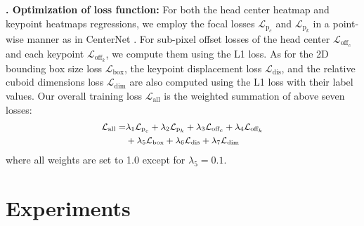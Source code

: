 \documentclass{article}
\begin{document}
{\bf {}. Optimization of loss function:}
For both the head center heatmap and keypoint heatmaps regressions, we employ the focal losses \cite{lin2017focal} $\mathcal{L}_{\textrm{p}_c}$ and $\mathcal{L}_{\textrm{p}_k}$ in a point-wise manner as in CenterNet \cite{zhou2019objects}. For sub-pixel offset losses of the head center $\mathcal{L}_{\textrm{off}_c}$ and each keypoint $\mathcal{L}_{\textrm{off}_k}$, we compute them using the L1 loss. As for the 2D bounding box size loss $\mathcal{L}_\textrm{box}$, the keypoint displacement loss $\mathcal{L}_\textrm{dis}$, and the relative cuboid dimensions loss $\mathcal{L}_\textrm{dim}$ are also computed using the L1 loss with their label values. Our overall training loss $\mathcal{L}_\textrm{all}$ is the weighted summation of above seven losses:
\begin{equation}\small \begin{aligned}
    \mathcal{L}_\textrm{all} = & \lambda_1\mathcal{L}_{\textrm{p}_c} + \lambda_2\mathcal{L}_{\textrm{p}_k} + \lambda_3\mathcal{L}_{\textrm{off}_c} + \lambda_4\mathcal{L}_{\textrm{off}_k} \\
    & + \lambda_5\mathcal{L}_\textrm{box} + \lambda_6\mathcal{L}_\textrm{dis} + \lambda_7\mathcal{L}_\textrm{dim}
    \label{allloss}
    \end{aligned}
\end{equation}
where all weights are set to 1.0 except for $\lambda_5=0.1$.


\section{Experiments}
\end{document}
